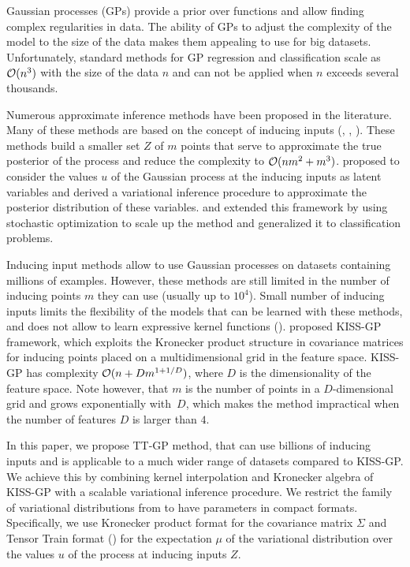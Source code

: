 Gaussian processes (GPs) provide a prior over functions and allow finding complex
regularities in data. The ability of GPs to adjust the complexity of the model
to the size of the data makes them appealing to use for big datasets.
Unfortunately, standard methods for GP regression and classification scale as
$\mathcal{O}(n^3)$ with the size of the data $n$ and can not be applied when $n$
exceeds several thousands.

Numerous approximate inference methods have been proposed in the literature. Many
of these methods are based on the concept of inducing inputs (\citet{candela2005},
\citet{snelson2006}, \citet{williams2000}). These methods build a smaller set
$Z$ of $m$ points that serve to approximate the true posterior of the process
and reduce the complexity to $\mathcal{O}(nm^2 + m^3)$. \citet{titsias2009} proposed
to consider the values $u$ of the Gaussian process at the inducing inputs
as latent variables and derived a variational inference procedure to approximate
the posterior distribution of these variables. \citet{hensman2013} and
\citet{hensman2015} extended this framework by using stochastic optimization to
scale up the method and generalized it to classification problems.

Inducing input methods allow to use Gaussian processes on datasets containing
millions of examples. However, these methods are still limited in the number
of inducing points $m$ they can use (usually up to $10^4$). Small number of 
inducing inputs limits the flexibility of the models that can be learned with 
these methods, and does not allow to learn expressive kernel functions 
(\citet{wilson2014}). \citet{wilson2015} proposed KISS-GP
framework, which exploits the Kronecker product structure in covariance matrices
for inducing points placed on a multidimensional grid in the feature space.
KISS-GP has complexity $\mathcal{O}(n + D m^{1 + 1/D})$, where $D$ is the dimensionality
of the feature space. Note however, that $m$ is the number of points in a
$D$-dimensional grid and grows exponentially with~$D$, which makes the method
impractical when the number of features $D$ is larger than $4$.

In this paper, we propose TT-GP method, that can use billions of inducing
inputs and is applicable to a much wider range of datasets compared to
KISS-GP.
We achieve this by combining kernel interpolation and Kronecker algebra of 
KISS-GP with a scalable variational inference procedure. We restrict the family of
variational distributions from \citet{hensman2013} to have parameters in
compact formats. Specifically, we use Kronecker product format for the
covariance matrix $\Sigma$ and Tensor Train format (\citet{oseledets2011}) for the
expectation $\mu$ of the variational distribution over the values $u$ of the
process at inducing inputs $Z$. 

